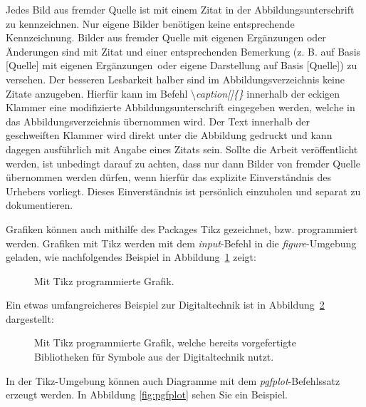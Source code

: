 Jedes Bild aus fremder Quelle ist mit einem Zitat in der Abbildungsunterschrift zu kennzeichnen. Nur eigene Bilder benötigen keine entsprechende Kennzeichnung. Bilder aus fremder Quelle mit eigenen Ergänzungen oder Änderungen sind mit Zitat und einer entsprechenden Bemerkung (z. B. \glqq auf Basis [Quelle] mit eigenen Ergänzungen\grqq~oder \glqq eigene Darstellung auf Basis [Quelle]\grqq) zu versehen. Der besseren Lesbarkeit halber sind im Abbildungsverzeichnis keine Zitate anzugeben. Hierfür kann im Befehl \textbackslash \textit{caption[]\{\}} innerhalb der eckigen Klammer eine modifizierte Abbildungsunterschrift eingegeben werden, welche in das Abbildungsverzeichnis übernommen wird. Der Text innerhalb der geschweiften Klammer wird direkt unter die Abbildung gedruckt und kann dagegen ausführlich mit Angabe eines Zitats sein. Sollte die Arbeit veröffentlicht werden, ist unbedingt darauf zu achten, dass nur dann Bilder von fremder Quelle übernommen werden dürfen, wenn hierfür das explizite Einverständnis des Urhebers vorliegt. Dieses Einverständnis ist persönlich einzuholen und separat zu dokumentieren.

Grafiken können auch mithilfe des Packages Tikz gezeichnet, bzw. programmiert werden. Grafiken mit Tikz werden mit dem \textit{input}-Befehl in die \textit{figure}-Umgebung geladen, wie nachfolgendes Beispiel in Abbildung~\ref{fig:tikz_house} zeigt:

\begin{figure}[hbt]
	\centering
	
	\caption[Mit Tikz programmierte Grafik.]{Mit Tikz programmierte Grafik.}
	\label{fig:tikz_house}
\end{figure}

Ein etwas umfangreicheres Beispiel zur Digitaltechnik ist in Abbildung~\ref{fig:tikz_digital} dargestellt:

\begin{figure}[hbt]
	\centering
	
	\caption[Mit Tikz programmierte Grafik, welche bereits vorgefertigte Bibliotheken für Symbole aus der Digitaltechnik nutzt.]{Mit Tikz programmierte Grafik, welche bereits vorgefertigte Bibliotheken für Symbole aus der Digitaltechnik nutzt.}
	\label{fig:tikz_digital}
\end{figure}


In der Tikz-Umgebung können auch Diagramme mit dem \textit{pgfplot}-Befehlssatz erzeugt werden. In Abbildung \ref{fig:pgfplot} sehen Sie ein Beispiel.


